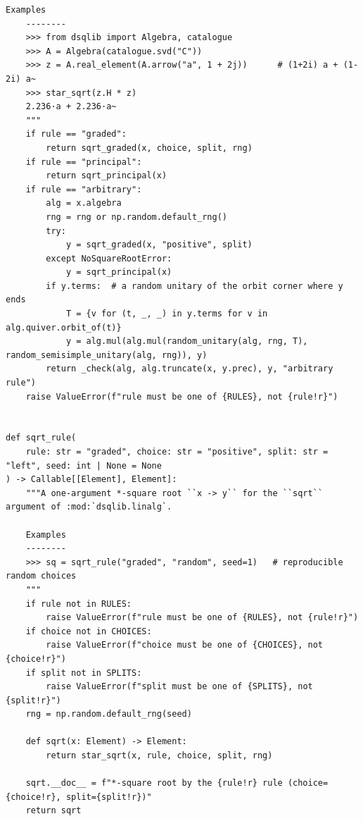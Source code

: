 \documentclass[12pt, a4paper]{report}
\theoremstyle{plain}
\theoremstyle{definition}
\theoremstyle{remark}
\theoremstyle{plain}
\begin{document}
\begin{lstlisting}[style=dsqcode]
    Examples
    --------
    >>> from dsqlib import Algebra, catalogue
    >>> A = Algebra(catalogue.svd("C"))
    >>> z = A.real_element(A.arrow("a", 1 + 2j))      # (1+2i) a + (1-2i) a~
    >>> star_sqrt(z.H * z)
    2.236·a + 2.236·a~
    """
    if rule == "graded":
        return sqrt_graded(x, choice, split, rng)
    if rule == "principal":
        return sqrt_principal(x)
    if rule == "arbitrary":
        alg = x.algebra
        rng = rng or np.random.default_rng()
        try:
            y = sqrt_graded(x, "positive", split)
        except NoSquareRootError:
            y = sqrt_principal(x)
        if y.terms:  # a random unitary of the orbit corner where y ends
            T = {v for (t, _, _) in y.terms for v in alg.quiver.orbit_of(t)}
            y = alg.mul(alg.mul(random_unitary(alg, rng, T), random_semisimple_unitary(alg, rng)), y)
        return _check(alg, alg.truncate(x, y.prec), y, "arbitrary rule")
    raise ValueError(f"rule must be one of {RULES}, not {rule!r}")


def sqrt_rule(
    rule: str = "graded", choice: str = "positive", split: str = "left", seed: int | None = None
) -> Callable[[Element], Element]:
    """A one-argument *-square root ``x -> y`` for the ``sqrt`` argument of :mod:`dsqlib.linalg`.

    Examples
    --------
    >>> sq = sqrt_rule("graded", "random", seed=1)   # reproducible random choices
    """
    if rule not in RULES:
        raise ValueError(f"rule must be one of {RULES}, not {rule!r}")
    if choice not in CHOICES:
        raise ValueError(f"choice must be one of {CHOICES}, not {choice!r}")
    if split not in SPLITS:
        raise ValueError(f"split must be one of {SPLITS}, not {split!r}")
    rng = np.random.default_rng(seed)

    def sqrt(x: Element) -> Element:
        return star_sqrt(x, rule, choice, split, rng)

    sqrt.__doc__ = f"*-square root by the {rule!r} rule (choice={choice!r}, split={split!r})"
    return sqrt
\end{lstlisting}
\end{document}
